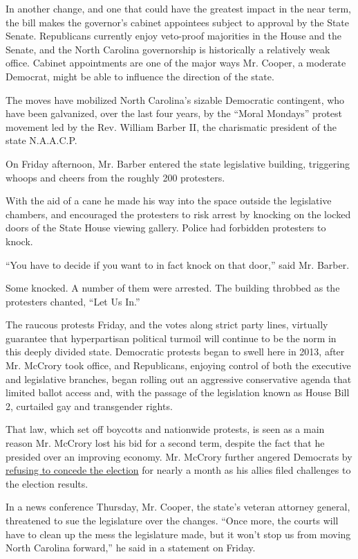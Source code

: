 In another change, and one that could have the greatest impact in the
near term, the bill makes the governor's cabinet appointees subject to
approval by the State Senate. Republicans currently enjoy veto-proof
majorities in the House and the Senate, and the North Carolina
governorship is historically a relatively weak office. Cabinet
appointments are one of the major ways Mr. Cooper, a moderate Democrat,
might be able to influence the direction of the state.

The moves have mobilized North Carolina's sizable Democratic contingent,
who have been galvanized, over the last four years, by the ``Moral
Mondays'' protest movement led by the Rev. William Barber II, the
charismatic president of the state N.A.A.C.P.

On Friday afternoon, Mr. Barber entered the state legislative building,
triggering whoops and cheers from the roughly 200 protesters.

With the aid of a cane he made his way into the space outside the
legislative chambers, and encouraged the protesters to risk arrest by
knocking on the locked doors of the State House viewing gallery. Police
had forbidden protesters to knock.

``You have to decide if you want to in fact knock on that door,'' said
Mr. Barber.

Some knocked. A number of them were arrested. The building throbbed as
the protesters chanted, ``Let Us In.''

The raucous protests Friday, and the votes along strict party lines,
virtually guarantee that hyperpartisan political turmoil will continue
to be the norm in this deeply divided state. Democratic protests began
to swell here in 2013, after Mr. McCrory took office, and Republicans,
enjoying control of both the executive and legislative branches, began
rolling out an aggressive conservative agenda that limited ballot access
and, with the passage of the legislation known as House Bill 2,
curtailed gay and transgender rights.

That law, which set off boycotts and nationwide protests, is seen as a
main reason Mr. McCrory lost his bid for a second term, despite the fact
that he presided over an improving economy. Mr. McCrory further angered
Democrats by
\href{https://www.nytimes3xbfgragh.onion/2016/11/29/us/north-carolina-governor-race.html}{refusing
to concede the election} for nearly a month as his allies filed
challenges to the election results.

In a news conference Thursday, Mr. Cooper, the state's veteran attorney
general, threatened to sue the legislature over the changes. ``Once
more, the courts will have to clean up the mess the legislature made,
but it won't stop us from moving North Carolina forward,'' he said in a
statement on Friday.

